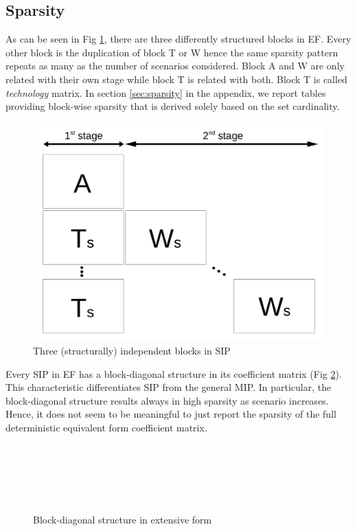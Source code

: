 \subsection{Sparsity} \label{subsec:sparsity}
As can be seen in Fig \ref{fig:stagewise_sparsity}, there are three differently structured blocks in EF. Every other block is the duplication of block T or W hence the same sparsity pattern repeats as many as the number of scenarios considered. Block A and W are only related with their own stage while block T is related with both. Block T is called \textit{technology}  matrix. In section \ref{sec:sparsity} in the appendix, we report tables providing block-wise sparsity that is derived solely based on the set cardinality.
\begin{figure}
	\centering
	\includegraphics[width=0.7\linewidth]{drawings/stagewise_sparsity}
	\caption{Three (structurally) independent blocks in SIP}
	\label{fig:stagewise_sparsity}
\end{figure}

Every SIP in EF has a block-diagonal structure in its coefficient matrix (Fig \ref{fig:de_structure}). This characteristic differentiates SIP from the general MIP. In particular, the block-diagonal structure results always in high sparsity as scenario increases. Hence, it does not seem to be meaningful to just report the sparsity of the full deterministic equivalent form coefficient matrix.
\begin{figure}[H]
	\centering
	~
	
	~
	
	~
	
	\caption{Block-diagonal structure in extensive form}
	\label{fig:de_structure}
\end{figure}

